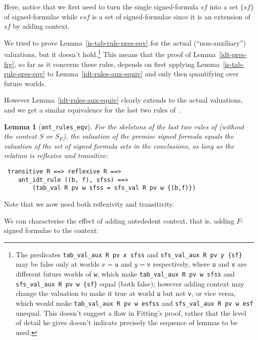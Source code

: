 \documentclass[a4paper]{article}
\newtheorem{lemma}{Lemma}
\begin{document}
Here, notice that we first need to turn the single signed-formula $sf$
into a set $\{sf\}$ of signed-formulae while $esf$ is a set of
signed-formulae since it is an extension of $sf$ by adding context.

We tried to prove Lemma~\ref{is-tab-rule-pres-eqv}
for the actual (``non-auxiliary'') valuations,
but it doesn't hold.\footnote{
The predicates \texttt{tab\_val\_aux R pv \textit{x} sfss} and 
\texttt{sfs\_val\_aux R pv \textit{y} \{sf\}} 
may be false only at worlds $x = \texttt{u}$ and $y = \texttt{v}$ 
respectively, where \texttt{u} and \texttt{v}
are different future worlds of \texttt{w},
which make
\texttt{tab\_val\_aux R pv w sfss} and \texttt{sfs\_val\_aux R pv w \{sf\}}
equal (both false);
however adding context may change the valuation to make it true
at world \texttt{u} but not \texttt{v}, or vice versa,
which would make 
\texttt{tab\_val\_aux R pv w esfss} and \texttt{sfs\_val\_aux R pv w esf}
unequal.
This doesn't suggest a flaw in Fitting's proof, rather that the level of detail
he gives doesn't indicate precisely the sequence of lemmas to be used.}
This means that the proof of Lemma~\ref{idt-pres-frg}, 
so far as it concerns these rules, depends on first applying 
Lemma~\ref{is-tab-rule-pres-eqv} to Lemma~\ref{idt-rules-aux-equiv}
and only then quantifying over future worlds.  

However Lemma~\ref{idt-rules-aux-equiv} clearly extends to the
actual valuations, and we get a similar equivalence
for the last two rules of~\cite[Figure~1.6]{fitting-dual-tableau}.

\begin{lemma}[\texttt{ant\_rules\_eqv}] \label{ant-rules-eqv} For the
  skeletons of the last two rules of \cite[Figure~1.6]{fitting-dual-tableau}
  (without the context $S$ or $S_F$),
  the valuation of the premise signed formula equals the
  valuation of the set of signed formula sets in the conclusions,
  as long as the relation is reflexive
  and transitive:
\end{lemma}
\begin{verbatim}
 transitive R ==> reflexive R ==> 
    ant_idt_rule ((b, f), sfss) ==>
        (tab_val R pv w sfss = sfs_val R pv w {(b,f)})
\end{verbatim}

Note that we now need both reflexivity and transitivity.

We can characterise the effect of adding antededent context, that is,
adding $F$-signed formulae to the context:
\end{document}
